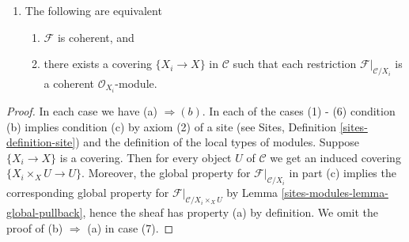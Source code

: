 \begin{lemma}
\begin{enumerate}
\begin{enumerate}
\item there exists a covering $\{X_i \to X\}$ in $\mathcal{C}$
such that each restriction $\mathcal{F}|_{\mathcal{C}/X_i}$
is an $\mathcal{O}_{X_i}$-module has a finite global presentation.
\end{enumerate}
\item The following are equivalent
\begin{enumerate}
\item $\mathcal{F}$ is coherent, and
\item there exists a covering $\{X_i \to X\}$ in $\mathcal{C}$
such that each restriction $\mathcal{F}|_{\mathcal{C}/X_i}$
is a coherent $\mathcal{O}_{X_i}$-module.
\end{enumerate}
\end{enumerate}
\end{lemma}

\begin{proof}
In each case we have (a) $\Rightarrow (b)$. In each of the cases (1) - (6)
condition (b) implies condition (c) by axiom (2) of a site
(see Sites, Definition \ref{sites-definition-site})
and the definition of the local types of modules.
Suppose $\{X_i \to X\}$ is a covering.
Then for every object $U$ of $\mathcal{C}$ we get an
induced covering $\{X_i \times_X U \to U\}$. Moreover, the global
property for $\mathcal{F}|_{\mathcal{C}/X_i}$ in part (c) implies
the corresponding global property for
$\mathcal{F}|_{\mathcal{C}/X_i \times_X U}$ by
Lemma \ref{sites-modules-lemma-global-pullback}, hence the sheaf has property (a)
by definition. We omit the proof of (b) $\Rightarrow$ (a) in case (7).
\end{proof}

